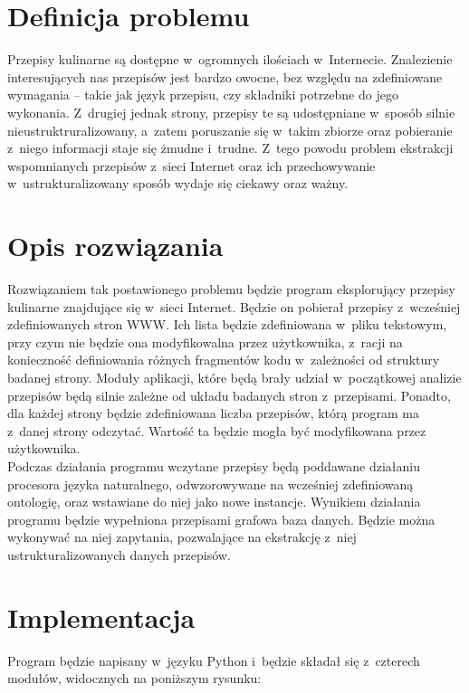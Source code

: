 \documentclass[11pt,a4paper]{article}
\begin{document}
\section{Definicja problemu}
Przepisy kulinarne są dostępne w~ogromnych ilościach w~Internecie. Znalezienie interesujących nas przepisów jest bardzo owocne, bez względu na zdefiniowane wymagania -- takie jak język przepisu, czy składniki potrzebne do jego wykonania. Z~drugiej jednak strony, przepisy te są udostępniane w~sposób silnie nieustruktruralizowany, a~zatem poruszanie się w~takim zbiorze oraz pobieranie z~niego informacji staje się żmudne i~trudne. Z~tego powodu problem ekstrakcji wspomnianych przepisów z~sieci Internet oraz ich przechowywanie w~ustrukturalizowany sposób wydaje się ciekawy oraz ważny.

\section{Opis rozwiązania}
Rozwiązaniem tak postawionego problemu będzie program eksplorujący przepisy kulinarne znajdujące się w~sieci Internet. Będzie on pobierał przepisy z~wcześniej zdefiniowanych stron WWW. Ich lista będzie zdefiniowana w~pliku tekstowym, przy czym nie będzie ona modyfikowalna przez użytkownika, z~racji na konieczność definiowania różnych fragmentów kodu w~zależności od struktury badanej strony. Moduły aplikacji, które będą brały udział w~początkowej analizie przepisów będą silnie zależne od układu badanych stron z~przepisami. Ponadto, dla każdej strony będzie zdefiniowana liczba przepisów, którą program ma z~danej strony odczytać. Wartość ta będzie mogła być modyfikowana przez użytkownika.\\

Podczas działania programu wczytane przepisy będą poddawane działaniu procesora języka naturalnego, odwzorowywane na wcześniej zdefiniowaną ontologię, oraz wstawiane do niej jako nowe instancje. Wynikiem działania programu będzie wypełniona przepisami grafowa baza danych. Będzie można wykonywać na niej zapytania, pozwalające na ekstrakcję z~niej ustrukturalizowanych danych przepisów.

\section{Implementacja}
Program będzie napisany w~języku Python i~będzie składał się z~czterech modułów, widocznych na poniższym rysunku:\\
\end{document}
